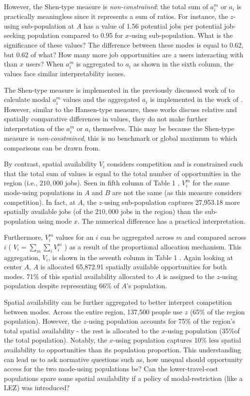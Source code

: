 \documentclass[]{trbunofficial}
\begin{document}
However, the Shen-type measure is \emph{non-constrained}: the total sum
of \(a_i^m\) or \(a_i\) is practically meaningless since it represents a
sum of ratios. For instance, the \(z\)-using sub-population at \(A\) has
a value of 1.56 potential jobs per potential job-seeking population
compared to 0.95 for \(x\)-using sub-population. What is the
significance of these values? The difference between these modes is
equal to 0.62, but 0.62 of what? How many more job opportunities are
\(z\) users interacting with than \(x\) users? When \(a_i^m\) is
aggregated to \(a_i\) as shown in the sixth column, the values face
similar interpretability issues.

The Shen-type measure is implemented in the previously discussed work of
\citet{taoInvestigatingImpactsPublic2020a} to calculate modal \(a_i^m\)
values and the aggregated \(a_i\) is implemented in the work of
\citet{carpentieriMultimodalAccessibilityPrimary2020}. However, similar
to the Hansen-type measure, these works discuss relative and spatially
comparative differences in values, they do not make further
interpretation of the \(a_i^m\) or \(a_i\) themselves. This may be
because the Shen-type measure is \emph{non-constrained}, this is no
benchmark or global maximum to which comparisons can be drawn from.

By contrast, spatial availability \(V_i\) considers competition and is
constrained such that the total sum of values is equal to the total
number of opportunities in the region (i.e., \(210,000\) jobs). Seen in
fifth column of Table 1 , \(V_i^m\) for the same mode-using populations
in \(A\) and \(B\) are not the same (as this measure considers
competition). In fact, at \(A\), the \(z\)-using sub-population captures
27,953.18 more spatially available jobs (of the \(210,000\) jobs in the
region) than the sub-population using mode \(x\). The numerical
difference has a practical interpretation.

Furthermore, \(V_i^m\) values for an \(i\) can be aggregated across
\(m\) and compared across \(i\) ( \(V_i = \sum_m{\sum_i{V_i^m}}\) ) as a
result of the proportional allocation mechanism. This aggregation,
\(V_i\), is shown in the seventh column in Table 1 . Again looking at
center \(A\), \(A\) is allocated 65,872.91 spatially available
opportunities for both modes. 71\% of this spatial availability
allocated to \(A\) is assigned to the \(z\)-using population despite
representing 66\% of \(A\)'s population.

Spatial availability can be further aggregated to better interpret
competition between modes. Across the entire region, 137,500 people use
\(z\) (65\% of the region population). However, the \(z\)-using
population accounts for 75\% of the region's total spatial availability
- the rest is allocated to the \(x\)-using population (35\%of the total
population). Notably, the \(x\)-using population captures 10\% less
spatial availability to opportunities than its population proportion.
This understanding can lead us to ask normative questions such as, how
unequal should opportunity access for the two mode-using populations be?
Can the lower-travel-cost populations spare some spatial availability if
a policy of modal-restriction (like a LEZ) was introduced?
\end{document}
